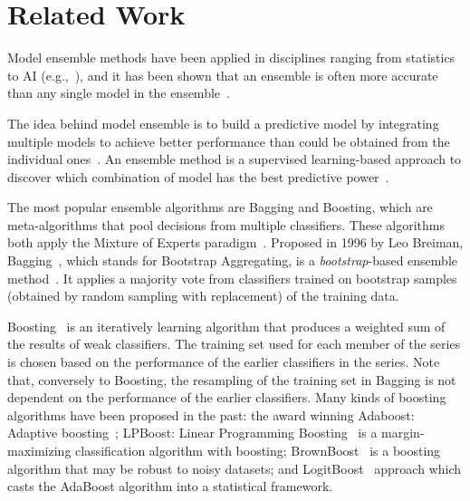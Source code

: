 \section{Related Work}
\label{sec-RelWork}
Model ensemble methods have been applied in disciplines ranging from statistics
to AI (e.g.,~\citep{breiman1996stacked,clemen1989combining,perrone1992soft,wolpert1992stacked}),
and it has been shown that an ensemble is often more accurate than any single
model in the ensemble~\citep{maclin2011popular}.

The idea behind model ensemble is to build a predictive model by
integrating multiple models to achieve better performance than could
be obtained from the individual
ones~\citep{maclin2011popular,rokach2010ensemble}. An ensemble method
is a supervised learning-based approach to discover which combination
of model has the best predictive power~\citep{kuncheva2003measures}.

The most popular ensemble algorithms are Bagging and Boosting, which are meta-algorithms
that pool decisions from multiple classifiers. These algorithms both apply the Mixture
of Experts paradigm~\citep{brown2010ensemble}.
%
Proposed in 1996 by Leo Breiman, Bagging~\citep{breiman1996stacked}, which stands for
Bootstrap Aggregating, is a \textit{bootstrap}-based ensemble method~\citep{efron1994introduction}.
It applies a majority vote from classifiers trained on bootstrap samples (obtained by
random sampling with replacement) of the training data.

Boosting~\citep{freund1996experiments,schapire1990strength} is an iteratively learning
algorithm that produces a weighted sum of the results of weak classifiers. The
training set used for each member of the series is chosen based on the performance of
the earlier classifiers in the series. Note that, conversely to Boosting, the resampling
of the training set in Bagging is not dependent on the performance of the earlier classifiers.
Many kinds of boosting algorithms have been proposed in the past: the
award winning Adaboost: Adaptive boosting~\citep{freund1996experiments}; LPBoost:
Linear Programming Boosting~\citep{demiriz2002linear} is a margin-maximizing classification
algorithm with boosting; BrownBoost~\cite{freund2001adaptive} is a boosting algorithm
that may be robust to noisy datasets; and LogitBoost~\cite{friedman2000additive} approach
which casts the AdaBoost algorithm into a statistical framework.

